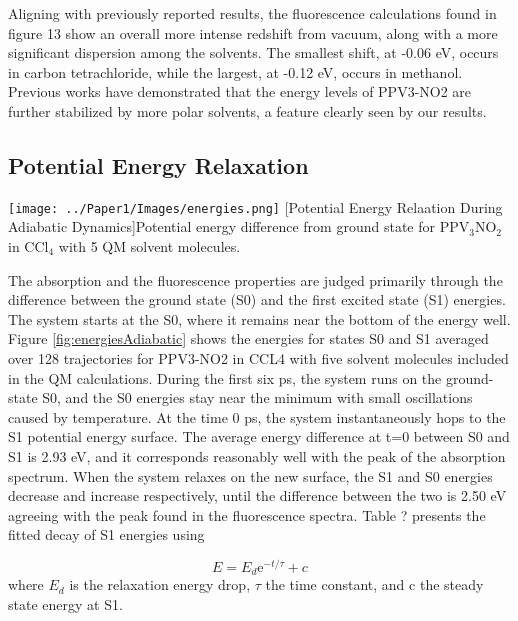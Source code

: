     Aligning with previously reported results, the fluorescence calculations found in figure 13 show an overall more intense redshift from vacuum, along with a more significant dispersion among the solvents. \cite{Park2013}
    The smallest shift, at -0.06 eV, occurs in carbon tetrachloride, while the largest, at -0.12 eV, occurs in methanol.
    Previous works have demonstrated that the energy levels of PPV3-NO2 are further stabilized by more polar solvents, a feature clearly seen by our results.

\subsection{Potential Energy Relaxation}

\noindent
\begin{minipage}[c]{\textwidth}
  \centering
  \texttt{[image: ../Paper1/Images/energies.png]}
  [Potential Energy Relaation During Adiabatic Dynamics]{Potential energy difference from ground state for PPV\(_3\)NO\(_2\) in CCl\(_4\) with 5 QM solvent molecules.}
  \label{fig:energiesAdiabatic}
\end{minipage}\bigskip

 The absorption and the fluorescence properties are judged primarily through the difference between the ground state (S0) and the first excited state (S1) energies.
 The system starts at the S0, where it remains near the bottom of the energy well.
 Figure \ref{fig:energiesAdiabatic} shows the energies for states S0 and S1 averaged over 128 trajectories for PPV3-NO2 in CCL4 with five solvent molecules included in the QM calculations.
 During the first six ps, the system runs on the ground-state S0, and the S0 energies stay near the minimum with small oscillations caused by temperature.
 At the time 0 ps, the system instantaneously hops to the S1 potential energy surface.
 The average energy difference at t=0 between S0 and S1 is 2.93 eV, and it corresponds reasonably well with the peak of the absorption spectrum.
 When the system relaxes on the new surface, the S1 and S0 energies decrease and increase respectively, until the difference between the two is 2.50 eV agreeing with the peak found in the fluorescence spectra.
 Table ? presents the fitted decay of S1 energies using   

\begin{equation}
E = E_d \text{e}^{-t/\tau} + c
\end{equation}
where \(E_d\) is the relaxation energy drop, \(\tau\) the time constant, and c the steady state energy at S1.

